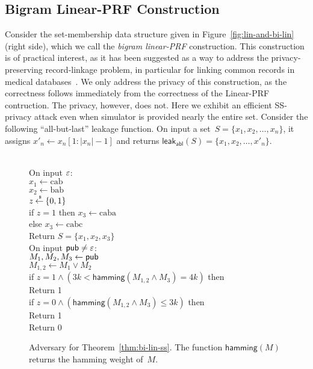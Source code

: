 \subsection{Bigram Linear-PRF Construction}
Consider the set-membership data structure given in Figure~\ref{fig:lin-and-bi-lin} (right side), which we call the \emph{bigram linear-PRF} construction.  This construction is of practical interest, as it has been suggested as a way to address the privacy-preserving record-linkage problem, in particular for linking common records in medical databases~\cite{neidermayer,xxx}.
We only address the privacy of this construction, as the correctness follows immediately from the correctness of the Linear-PRF contruction.  The privacy, however, does not.  Here we exhibit an efficient SS-privacy attack even when simulator is provided nearly the entire set.  Consider the following ``all-but-last'' leakage function.  On input a set~$S=\{x_1,x_2,\ldots,x_n\}$, it assigns $x'_n \gets x_n[1:|x_n|-1]$ and returns $\mathsf{leak_{abl}}(S)=\{x_1,x_2,\ldots,x'_n\}$.  

\begin{figure}[tp]
\centering
{}
{
\\[1ex]
On input $\varepsilon$:\\
\nudge $x_1 \gets \mathrm{cab}$\\
\nudge $x_2 \gets \mathrm{bab}$\\
\nudge $z {\:\stackrel{{\scriptscriptstyle \hspace{0.2em}\$}} {\leftarrow}\:} \{0,1\}$\\
\nudge if $z=1$ then $x_3 \gets \mathrm{caba}$\\
\nudge else $x_3 \gets \mathrm{cabc}$\\
\nudge Return $S=\{x_1,x_2,x_3\}$\\
On input ${\sf pub} \neq \varepsilon$:\\
\nudge $M_1,M_2,M_3 \gets {\sf pub}$\\
\nudge $M_{1,2} \gets M_1 \vee M_2$\\
\nudge if $z=1 \wedge \left(3k < \mathsf{hamming}(M_{1,2} \wedge M_3) = 4k\right)$ then \\
\nudge\nudge Return 1 \\
\nudge if $z=0 \wedge \left(\mathsf{hamming}(M_{1,2} \wedge M_3) \leq 3k\right)$ then \\
\nudge\nudge Return 1 \\
\nudge Return 0
}
\caption{Adversary for Theorem~\ref{thm:bi-lin-ss}. The function $\mathsf{hamming}(M)$ returns the hamming weight of~$M$.}
\label{fig:adv-bi-lin-ss}
\end{figure}

